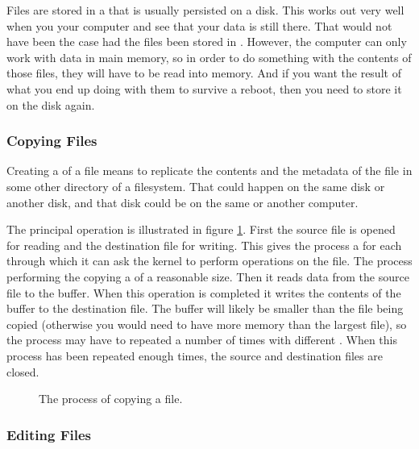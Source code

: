 Files are stored in a  that is usually persisted on a disk. This works out very well when you  your computer and see that your data is still there. That would not have been the case had the files been stored in . However, the computer can only work with data in main memory, so in order to do something with the contents of those files, they will have to be read into memory. And if you want the result of what you end up doing with them to survive a reboot, then you need to store it on the disk again.

\subsubsection{Copying Files}

Creating a  of a file means to replicate the contents and the metadata of the file in some other directory of a filesystem. That could happen on the same disk or another disk, and that disk could be on the same or another computer.

The principal operation is illustrated in figure \ref{fig:bg:processes:copy}. First the source file is opened for reading and the destination file for writing. This gives the process a  for each through which it can ask the kernel to perform operations on the file. The process performing the copying  a  of a reasonable size. Then it reads data from the source file to the buffer. When this operation is completed it writes the contents of the buffer to the destination file. The buffer will likely be smaller than the file being copied (otherwise you would need to have more memory than the largest file), so the process may have to repeated a number of times with different . When this process has been repeated enough times, the source and destination files are closed.

\begin{figure}[tbp]
  
  \caption{The process of copying a file.}
  \label{fig:bg:processes:copy}
\end{figure}

\subsubsection{Editing Files}

